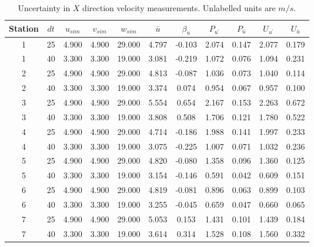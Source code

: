 \begin{table}[H]
\begin{center}
\begin{tabular}{|ccccccccccc|}
	\hline
	Station & $dt$ & $u_{sim}$ & $v_{sim}$ & $w_{sim}$ & $\bar{u}$ & $\beta_u$ & $P_{u^{\prime}}$ & $P_{\bar{u}}$ & $U_{u^{\prime}}$ & $U_{\bar{u}}$\\
	\hline
	1 & 25 & 4.900 & 4.900 & 29.000 & 4.797 & -0.103 & 2.074 & 0.147 & 2.077 & 0.179\\
	1 & 40 & 3.300 & 3.300 & 19.000 & 3.081 & -0.219 & 1.072 & 0.076 & 1.094 & 0.231\\
	2 & 25 & 4.900 & 4.900 & 29.000 & 4.813 & -0.087 & 1.036 & 0.073 & 1.040 & 0.114\\
	2 & 40 & 3.300 & 3.300 & 19.000 & 3.374 & 0.074 & 0.954 & 0.067 & 0.957 & 0.100\\
	3 & 25 & 4.900 & 4.900 & 29.000 & 5.554 & 0.654 & 2.167 & 0.153 & 2.263 & 0.672\\
	3 & 40 & 3.300 & 3.300 & 19.000 & 3.808 & 0.508 & 1.706 & 0.121 & 1.780 & 0.522\\
	4 & 25 & 4.900 & 4.900 & 29.000 & 4.714 & -0.186 & 1.988 & 0.141 & 1.997 & 0.233\\
	4 & 40 & 3.300 & 3.300 & 19.000 & 3.075 & -0.225 & 1.007 & 0.071 & 1.032 & 0.236\\
	5 & 25 & 4.900 & 4.900 & 29.000 & 4.820 & -0.080 & 1.358 & 0.096 & 1.360 & 0.125\\
	5 & 40 & 3.300 & 3.300 & 19.000 & 3.154 & -0.146 & 0.591 & 0.042 & 0.609 & 0.151\\
	6 & 25 & 4.900 & 4.900 & 29.000 & 4.819 & -0.081 & 0.896 & 0.063 & 0.899 & 0.103\\
	6 & 40 & 3.300 & 3.300 & 19.000 & 3.255 & -0.045 & 0.659 & 0.047 & 0.660 & 0.065\\
	7 & 25 & 4.900 & 4.900 & 29.000 & 5.053 & 0.153 & 1.431 & 0.101 & 1.439 & 0.184\\
	7 & 40 & 3.300 & 3.300 & 19.000 & 3.614 & 0.314 & 1.528 & 0.108 & 1.560 & 0.332\\
	\hline
\end{tabular}
\caption{Uncertainty in $X$ direction velocity measurements. Unlabelled units are $m/s$.}
\label{table:uncertainties_u}
\end{center}
\end{table}
